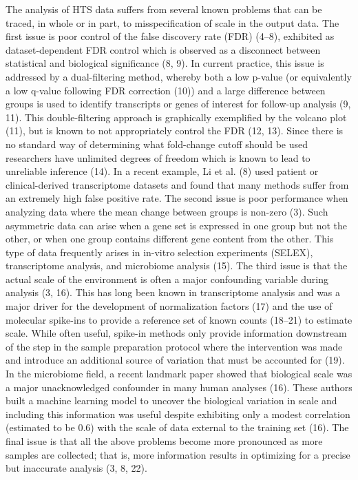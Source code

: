 \documentclass[
]{article}
\begin{document}
The analysis of HTS data suffers from several known problems that can be
traced, in whole or in part, to misspecification of scale in the output
data. The first issue is poor control of the false discovery rate (FDR)
(4--8), exhibited as dataset-dependent FDR control which is observed as
a disconnect between statistical and biological significance (8, 9). In
current practice, this issue is addressed by a dual-filtering method,
whereby both a low p-value (or equivalently a low q-value following FDR
correction (10)) and a large difference between groups is used to
identify transcripts or genes of interest for follow-up analysis (9,
11). This double-filtering approach is graphically exemplified by the
volcano plot (11), but is known to not appropriately control the FDR
(12, 13). Since there is no standard way of determining what fold-change
cutoff should be used researchers have unlimited degrees of freedom
which is known to lead to unreliable inference (14). In a recent
example, Li et al. (8) used patient or clinical-derived transcriptome
datasets and found that many methods suffer from an extremely high false
positive rate. The second issue is poor performance when analyzing data
where the mean change between groups is non-zero (3). Such asymmetric
data can arise when a gene set is expressed in one group but not the
other, or when one group contains different gene content from the other.
This type of data frequently arises in in-vitro selection experiments
(SELEX), transcriptome analysis, and microbiome analysis (15). The third
issue is that the actual scale of the environment is often a major
confounding variable during analysis (3, 16). This has long been known
in transcriptome analysis and was a major driver for the development of
normalization factors (17) and the use of molecular spike-ins to provide
a reference set of known counts (18--21) to estimate scale. While often
useful, spike-in methods only provide information downstream of the step
in the sample preparation protocol where the intervention was made and
introduce an additional source of variation that must be accounted for
(19). In the microbiome field, a recent landmark paper showed that
biological scale was a major unacknowledged confounder in many human
analyses (16). These authors built a machine learning model to uncover
the biological variation in scale and including this information was
useful despite exhibiting only a modest correlation (estimated to be
0.6) with the scale of data external to the training set (16). The final
issue is that all the above problems become more pronounced as more
samples are collected; that is, more information results in optimizing
for a precise but inaccurate analysis (3, 8, 22).
\end{document}
